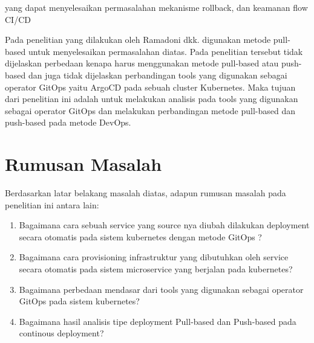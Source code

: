 yang dapat menyelesaikan permasalahan mekanisme rollback, dan keamanan flow CI/CD
\par
Pada penelitian yang dilakukan oleh Ramadoni dkk. \cite{Ramadoni2021} digunakan metode pull-based untuk menyelesaikan permasalahan diatas. Pada penelitian tersebut tidak
dijelaskan perbedaan kenapa harus menggunakan metode pull-based atau push-based dan juga tidak dijelaskan
perbandingan tools yang digunakan sebagai operator GitOps yaitu ArgoCD pada sebuah cluster Kubernetes.
Maka tujuan dari penelitian ini adalah untuk melakukan analisis pada tools yang digunakan
sebagai operator GitOps dan melakukan perbandingan metode pull-based dan push-based pada metode DevOps.

\vspace{0.5cm}
\section{Rumusan Masalah}
Berdasarkan latar belakang masalah diatas, adapun rumusan masalah pada penelitian ini antara lain:
\begin{enumerate}[label=\alph*.]
    \item Bagaimana cara sebuah service yang source nya diubah dilakukan  deployment secara otomatis pada sistem kubernetes dengan metode GitOps ?
    \item Bagaimana cara provisioning infrastruktur yang dibutuhkan oleh service  secara otomatis pada sistem microservice yang berjalan pada kubernetes?
    \item Bagaimana perbedaan mendasar dari tools yang digunakan sebagai operator GitOps pada sistem kubernetes?
    \item Bagaimana hasil analisis tipe deployment Pull-based dan Push-based pada continous deployment?
\end{enumerate}

\vspace{0.5cm}
